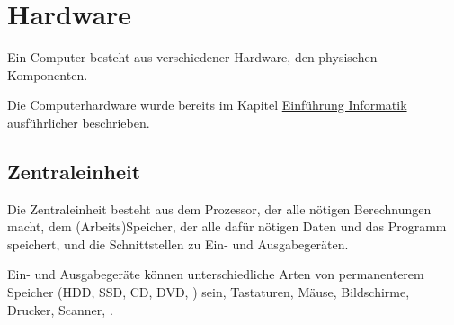 \documentclass{article}
\begin{document}
\section{Hardware} 
Ein Computer besteht aus verschiedener Hardware, den physischen Komponenten.

Die Computerhardware wurde bereits im Kapitel \hyperref[sec:informatik_computer_hardware]{Einführung Informatik} ausführlicher beschrieben.

\subsection{Zentraleinheit}
Die Zentraleinheit besteht aus dem Prozessor, der alle nötigen Berechnungen macht, dem (Arbeits)Speicher, der alle dafür nötigen Daten und das Programm speichert, und die Schnittstellen zu Ein- und Ausgabegeräten.

Ein- und Ausgabegeräte können unterschiedliche Arten von permanenterem Speicher (HDD, SSD, CD, DVD, \etc) sein, Tastaturen, Mäuse, Bildschirme, Drucker, Scanner, \etc.
\end{document}
